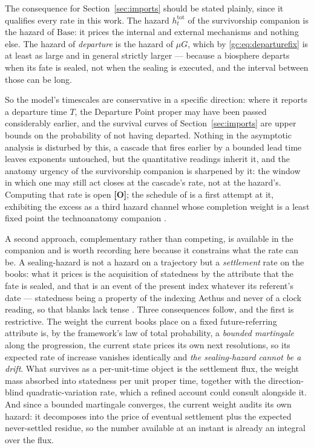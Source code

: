 \begin{remark}
\label{gc:rem:hazardlower}
The consequence for Section~\ref{sec:imports} should be stated plainly, since it
qualifies every rate in this work. The hazard $h^{\mathrm{tot}}_t$ of
the survivorship companion \cite{GoldenSurvivorship} is the hazard of $\mathrm{Base}$: it prices the
internal and external mechanisms and nothing else. The hazard of
\emph{departure} is the hazard of $\mu G$, which by
\eqref{gc:eq:departurefix} is at least as large and in general strictly
larger --- because a biosphere departs when its fate is sealed, not
when the sealing is executed, and the interval between those can be
long.

So the model's timescales are conservative in a specific direction:
where it reports a departure time $T$, the Departure Point proper may
have been passed considerably earlier, and the survival curves of
Section~\ref{sec:imports} are upper bounds on the probability of not
having departed. Nothing in the asymptotic analysis is disturbed by
this, a cascade that fires earlier by a bounded lead time leaves
exponents untouched, but the quantitative readings inherit it, and
the anatomy urgency of the survivorship companion \cite{GoldenSurvivorship} is sharpened by it: the
window in which one may still act closes at the cascade's rate, not at
the hazard's. Computing that rate is open \textbf{[O]};
the schedule of \cite{GoldenTechnoanatomy} is a first attempt at it, exhibiting the excess
as a third hazard channel whose completion weight is a least fixed point
the technoanatomy companion \cite{GoldenTechnoanatomy}.

A second approach, complementary rather than competing, is available in
the companion and is worth recording here because it constrains what the
rate can be. A sealing-hazard is not a hazard on a trajectory but a
\emph{settlement} rate on the books: what it prices is the acquisition of
statedness by the attribute that the fate is sealed, and that is an
event of the present index whatever its referent's date --- statedness
being a property of the indexing Aethus and never of a clock reading, so
that blanks lack tense \cite{Aethus,AethusDecision}. Three consequences follow, and the first is
restrictive. The weight the current books place on a fixed
future-referring attribute is, by the framework's law of total
probability, a \emph{bounded martingale} along the progression, the
current state prices its own next resolutions, so its expected rate of
increase vanishes identically and \emph{the sealing-hazard cannot be a
drift}. What survives as a per-unit-time object is the settlement flux,
the weight mass absorbed into statedness per unit proper time, together
with the direction-blind quadratic-variation rate, which a refined
account could consult alongside it. And since a bounded martingale
converges, the current weight audits its own hazard: it decomposes into
the price of eventual settlement plus the expected never-settled residue,
so the number available at an instant is already an integral over the
flux.


\end{remark}
